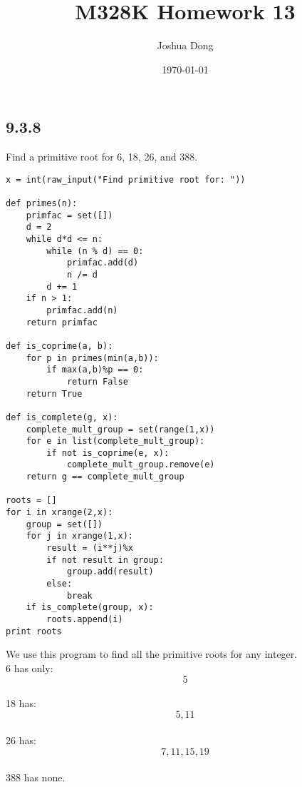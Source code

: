 \documentclass{article}
\begin{document}
\title{M328K\: Homework 13}
\author{Joshua Dong}
\date{\today}
\maketitle

\subsection{9.3.8}
Find a primitive root for 6, 18, 26, and 388.
\\
\begin{lstlisting}
x = int(raw_input("Find primitive root for: "))

def primes(n):
    primfac = set([])
    d = 2
    while d*d <= n:
        while (n % d) == 0:
            primfac.add(d)
            n /= d
        d += 1
    if n > 1:
        primfac.add(n)
    return primfac

def is_coprime(a, b):
    for p in primes(min(a,b)):
        if max(a,b)%p == 0:
            return False
    return True

def is_complete(g, x):
    complete_mult_group = set(range(1,x))
    for e in list(complete_mult_group):
        if not is_coprime(e, x):
            complete_mult_group.remove(e)
    return g == complete_mult_group

roots = []
for i in xrange(2,x):
    group = set([])
    for j in xrange(1,x):
        result = (i**j)%x
        if not result in group:
            group.add(result)
        else:
            break
    if is_complete(group, x):
        roots.append(i)
print roots
\end{lstlisting}
We use this program to find all the primitive roots for any integer.
\\6 has only: \[5\]
\\18 has: \[5, 11\]
\\26 has: \[7, 11, 15, 19\]
\\388 has none. 
\end{document}
